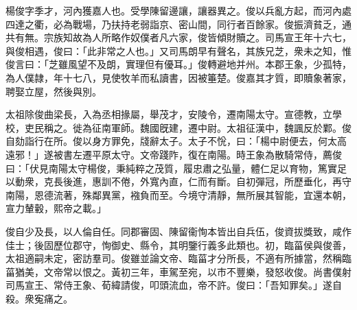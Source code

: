 \begin{pinyinscope}
 
 
 楊俊字季才，河內獲嘉人也。受學陳留邊讓，讓器異之。俊以兵亂方起，而河內處四達之衢，必為戰場，乃扶持老弱詣京、密山間，同行者百餘家。俊振濟貧乏，通共有無。宗族知故為人所略作奴僕者凡六家，俊皆傾財贖之。司馬宣王年十六七，與俊相遇，俊曰：「此非常之人也。」又司馬朗早有聲名，其族兄芝，衆未之知，惟俊言曰：「芝雖風望不及朗，實理但有優耳。」俊轉避地并州。本郡王象，少孤特，為人僕隷，年十七八，見使牧羊而私讀書，因被箠楚。俊嘉其才質，即贖象著家，聘娶立屋，然後與別。
 
 
 
 
 太祖除俊曲梁長，入為丞相掾屬，舉茂才，安陵令，遷南陽太守。宣德教，立學校，吏民稱之。徙為征南軍師。魏國旣建，遷中尉。太祖征漢中，魏諷反於鄴。俊自劾詣行在所。俊以身方罪免，牋辭太子。太子不恱，曰：「楊中尉便去，何太高遠邪！」遂被書左遷平原太守。文帝踐阼，復在南陽。時王象為散騎常侍，薦俊曰：「伏見南陽太守楊俊，秉純粹之茂質，履忠肅之弘量，體仁足以育物，篤實足以動衆，克長後進，惠訓不倦，外寬內直，仁而有斷。自初彈冠，所歷垂化，再守南陽，恩德流著，殊鄰異黨，襁負而至。今境守清靜，無所展其智能，宜還本朝，宣力輦轂，熙帝之載。」
 
 
 
 
 俊自少及長，以人倫自任。同郡審固、陳留衞恂本皆出自兵伍，俊資拔獎致，咸作佳士；後固歷位郡守，恂御史、縣令，其明鑒行義多此類也。初，臨菑侯與俊善，太祖適嗣未定，密訪羣司。俊雖並論文帝、臨菑才分所長，不適有所據當，然稱臨菑猶美，文帝常以恨之。黃初三年，車駕至宛，以巿不豐樂，發怒收俊。尚書僕射司馬宣王、常侍王象、荀緯請俊，叩頭流血，帝不許。俊曰：「吾知罪矣。」遂自殺。衆寃痛之。
 
 
 
 
\end{pinyinscope}